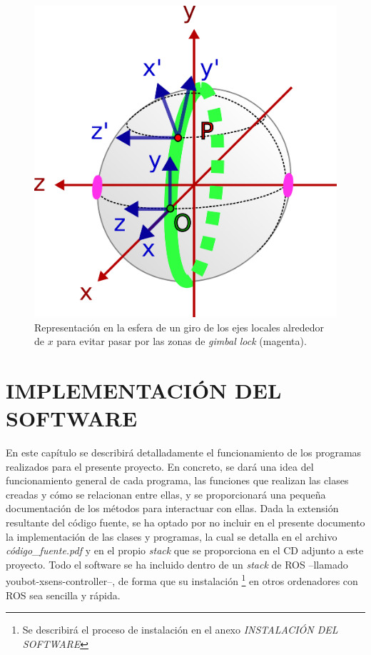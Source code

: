 \documentclass[12pt, a4paper]{report}
\begin{document}
\begin{figure}[h]
	\centering
		\includegraphics[scale=0.85]{../img/yaxis.png} 
	\caption[Giro de los ejes locales para evitar el gimbal lock]{Representación en la esfera de un giro de los ejes locales alrededor de $x$ para evitar pasar por las zonas de \textit{gimbal lock} (magenta).} 
	\label{fig: y_axis}
\end{figure}

\chapter{IMPLEMENTACIÓN DEL SOFTWARE}

En este capítulo se describirá detalladamente el funcionamiento de los programas realizados para el presente proyecto. En concreto, se dará una idea del funcionamiento general de cada programa, las funciones que realizan las clases creadas y cómo se relacionan entre ellas, y se proporcionará una pequeña documentación de los métodos para interactuar con ellas. Dada la extensión resultante del código fuente, se ha optado por no incluir en el presente documento la implementación de las clases y programas, la cual se detalla en el archivo \textit{código\_fuente.pdf} y en el propio \textit{stack} que se proporciona en el CD adjunto a este proyecto. Todo el software se ha incluido dentro de un \textit{stack} de ROS --llamado youbot-xsens-controller--, de forma que su instalación \footnote{Se describirá el proceso de instalación en el anexo \textit{INSTALACIÓN DEL SOFTWARE}} en otros ordenadores con ROS sea sencilla y rápida.\\
\end{document}
